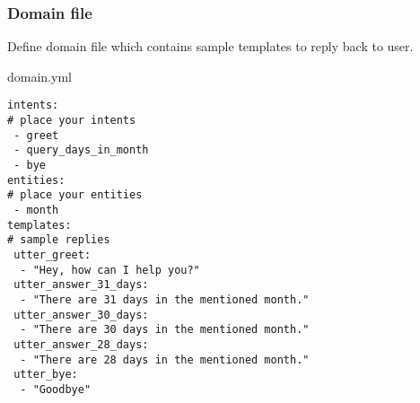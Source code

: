 









 \begin{frame}[fragile]\frametitle{Domain file}
Define domain file which contains sample templates to reply back to user.

domain.yml
\begin{lstlisting}
intents:
# place your intents
 - greet
 - query_days_in_month
 - bye
entities:
# place your entities
 - month
templates:
# sample replies
 utter_greet:
  - "Hey, how can I help you?"
 utter_answer_31_days:
  - "There are 31 days in the mentioned month."
 utter_answer_30_days:
  - "There are 30 days in the mentioned month."
 utter_answer_28_days:
  - "There are 28 days in the mentioned month."
 utter_bye:
  - "Goodbye"
\end{lstlisting}
\end{frame}

